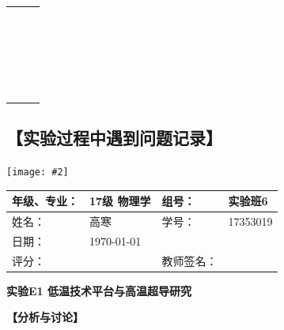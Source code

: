 \documentclass[11pt,a4paper]{ctexart}
\newcommand{\ExpeName}{实验E1 低温技术平台与高温超导研究}
\newcommand{\cpic}[2]{
\begin{center}
\texttt{[image: \#2]}
\end{center}
}
\begin{document}
\begin{enumerate}
\begin{table}[H]
\begin{tabular}{|p{32mm}|p{32mm}|p{32mm}|}
  &  &\\ \hline
  &  &\\ \hline
  &  &\\ \hline
  &  &\\ \hline
  &  &\\ \hline
  &  &\\ \hline
  &  &\\ \hline
  &  &\\ \hline
  &  &\\ \hline
  &  &\\ \hline
    & &\\ \hline
  & &\\ \hline
   & &\\ \hline
     &  &\\ \hline
  &  &\\ \hline
  &  &\\ \hline
  &  &\\ \hline
  &  &\\ \hline
  &  &\\ \hline
  &  &\\ \hline
  &  &\\ \hline
    & &\\ \hline
  & &\\ \hline
   & &\\ \hline
  \end{tabular}
  \end{table}
 \end{enumerate}


\subsection{【实验过程中遇到问题记录】}\par
\cpic{0.81}{none}
%


\newpage%
\begin{table}[H]
\centering
\begin{tabular}{|p{32mm}|p{32mm}|p{32mm}|p{32mm}|}
\hline
年级、专业： & 17级 物理学 & 组号： & 实验班6 \\ \hline
姓名： & 高寒 & 学号： & 17353019 \\ \hline
日期： & \today &  &  \\ \hline
评分： &  & 教师签名： &  \\ \hline
\end{tabular}
\end{table}
\begin{center}
\LARGE\textbf{{\ExpeName}}
\end{center}
\textbf{【分析与讨论】}\\

\newpage


\end{document}
